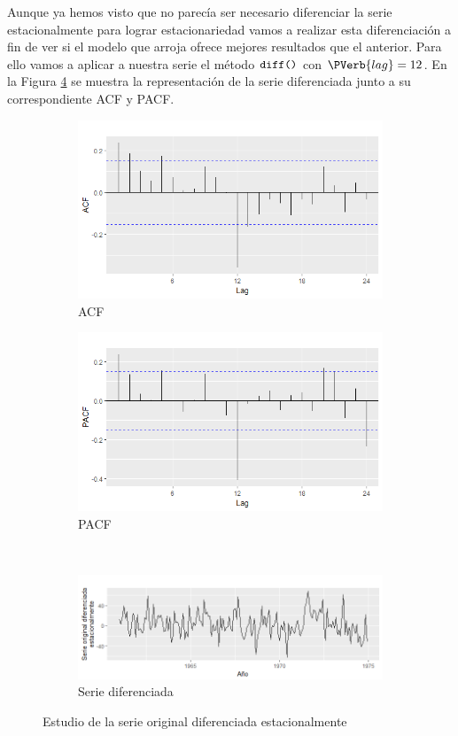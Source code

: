 Aunque ya hemos visto que no parecía ser necesario diferenciar la serie estacionalmente para lograr estacionariedad vamos a realizar esta diferenciación a fin de ver si el modelo que arroja ofrece mejores resultados que el anterior. Para ello vamos a aplicar a nuestra serie el método $\verb!diff()!$ con $\PVerb{lag} = 12$. En la Figura \ref{diff} se muestra la representación de la serie diferenciada junto a su correspondiente ACF y PACF.
\begin{figure}
\begin{subfigure}{.5\linewidth}
\centering
\includegraphics[width=.7\linewidth]{Images/Modelizacion/3192.png}
\caption{ACF}
\label{fig:sub1}
\end{subfigure}%
\begin{subfigure}{.5\linewidth}
\centering
\includegraphics[width=.7\linewidth]{Images/Modelizacion/3193.png}
\caption{PACF}
\label{fig:sub2}
\end{subfigure}\\[1ex]
\begin{subfigure}{\linewidth}
\centering
\includegraphics[width=.5\linewidth]{Images/Modelizacion/3191.png}
\caption{Serie diferenciada}
\label{fig:sub3}
\end{subfigure}
\caption{Estudio de la serie original diferenciada estacionalmente}
\label{diff}
\end{figure}

